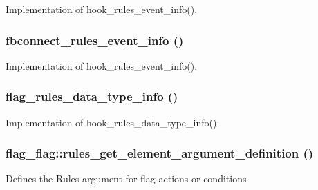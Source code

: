 Implementation of hook\_\-rules\_\-event\_\-info(). \hypertarget{group__rules_g7b8c5825c911c7ac2679b1966f5c0987}{
\subsubsection[{fbconnect\_\-rules\_\-event\_\-info}]{\setlength{\rightskip}{0pt plus 5cm}fbconnect\_\-rules\_\-event\_\-info ()}}
\label{group__rules_g7b8c5825c911c7ac2679b1966f5c0987}


Implementation of hook\_\-rules\_\-event\_\-info(). \hypertarget{group__rules_g79d47f2b9589f76b339066ca3d6dee1e}{
\subsubsection[{flag\_\-rules\_\-data\_\-type\_\-info}]{\setlength{\rightskip}{0pt plus 5cm}flag\_\-rules\_\-data\_\-type\_\-info ()}}
\label{group__rules_g79d47f2b9589f76b339066ca3d6dee1e}


Implementation of hook\_\-rules\_\-data\_\-type\_\-info(). \hypertarget{group__rules_g88951558f573d816de08b9e9d49ff4c2}{
\subsubsection[{rules\_\-get\_\-element\_\-argument\_\-definition}]{\setlength{\rightskip}{0pt plus 5cm}flag\_\-flag::rules\_\-get\_\-element\_\-argument\_\-definition ()}}
\label{group__rules_g88951558f573d816de08b9e9d49ff4c2}


Defines the Rules argument for flag actions or conditions 


